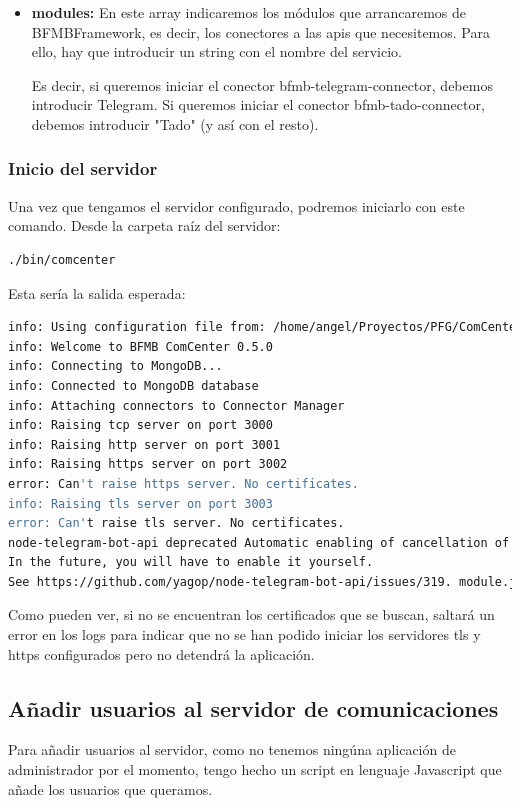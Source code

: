 \documentclass[spanish,12pt, a4paper, twoside]{paper}
\begin{document}
\begin{itemize}
\item\textbf{modules:} En este array indicaremos los módulos que arrancaremos de BFMBFramework, es decir, los conectores a las apis que necesitemos. Para ello, hay que introducir un string con el nombre del servicio.

Es decir, si queremos iniciar el conector bfmb-telegram-connector, debemos introducir Telegram. Si queremos iniciar el conector bfmb-tado-connector, debemos introducir "Tado" (y así con el resto).
\end{itemize}

\subsubsection{Inicio del servidor} Una vez que tengamos el servidor configurado, podremos iniciarlo con este comando. Desde la carpeta raíz del servidor:
\begin{lstlisting}[language=sh]
./bin/comcenter
\end{lstlisting}

Esta sería la salida esperada:
\begin{lstlisting}[language=sh]
info: Using configuration file from: /home/angel/Proyectos/PFG/ComCenter/config.json
info: Welcome to BFMB ComCenter 0.5.0
info: Connecting to MongoDB...
info: Connected to MongoDB database
info: Attaching connectors to Connector Manager
info: Raising tcp server on port 3000
info: Raising http server on port 3001
info: Raising https server on port 3002
error: Can't raise https server. No certificates.
info: Raising tls server on port 3003
error: Can't raise tls server. No certificates.
node-telegram-bot-api deprecated Automatic enabling of cancellation of promises is deprecated.
In the future, you will have to enable it yourself.
See https://github.com/yagop/node-telegram-bot-api/issues/319. module.js:653:30
\end{lstlisting}

Como pueden ver, si no se encuentran los certificados que se buscan, saltará un error en los logs para indicar que no se han podido iniciar los servidores tls y https configurados pero no detendrá la aplicación.

\subsection{Añadir usuarios al servidor de comunicaciones}

Para añadir usuarios al servidor, como no tenemos ningúna aplicación de administrador por el momento, tengo hecho un script en lenguaje Javascript que añade los usuarios que queramos.
\end{document}
